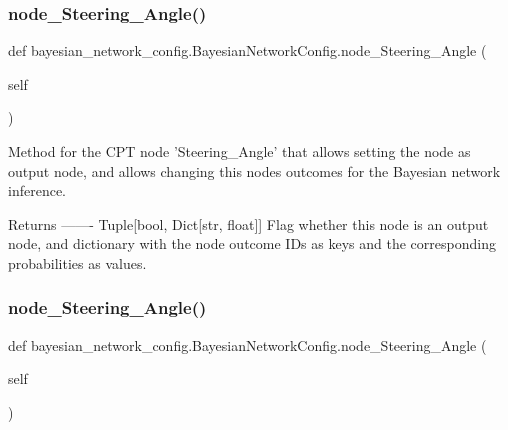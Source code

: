 \subsubsection{\texorpdfstring{node\+\_\+\+Steering\+\_\+\+Angle()}{node\_Steering\_Angle()}\hspace{0.1cm}{\footnotesize\ttfamily [1/2]}}
{\footnotesize\ttfamily def bayesian\+\_\+network\+\_\+config.\+Bayesian\+Network\+Config.\+node\+\_\+\+Steering\+\_\+\+Angle (\begin{DoxyParamCaption}\item[{}]{self }\end{DoxyParamCaption})}

\begin{DoxyVerb}Method for the CPT node 'Steering_Angle' that allows setting the node as output node,
and allows changing this nodes outcomes for the Bayesian network inference.

Returns
-------
Tuple[bool, Dict[str, float]]
    Flag whether this node is an output node, and dictionary with the node outcome IDs as keys
    and the corresponding probabilities as values.
\end{DoxyVerb}
 \mbox{\label{classbayesian__network__config_1_1_bayesian_network_config_a27d247927ce168025568fdf0d467b78d}} 
\subsubsection{\texorpdfstring{node\+\_\+\+Steering\+\_\+\+Angle()}{node\_Steering\_Angle()}\hspace{0.1cm}{\footnotesize\ttfamily [2/2]}}
{\footnotesize\ttfamily def bayesian\+\_\+network\+\_\+config.\+Bayesian\+Network\+Config.\+node\+\_\+\+Steering\+\_\+\+Angle (\begin{DoxyParamCaption}\item[{}]{self }\end{DoxyParamCaption})}

